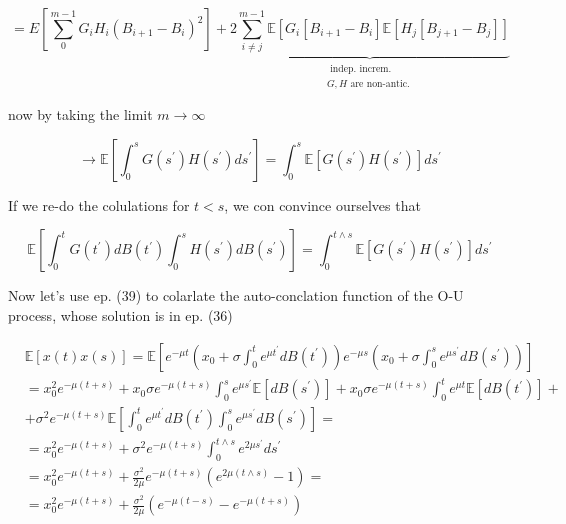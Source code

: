 \documentclass[10pt]{article}
\begin{document}
$$
=E\left[\sum_{0}^{m-1} G_{i} H_{i}\left(B_{i+1}-B_{i}\right)^{2}\right]+\underbrace{2 \sum_{i \neq j}^{m-1} \mathbb{E}\left[G_{i}\left[B_{i+1}-B_{i}\right] \mathbb{E}\left[H_{j}\left[B_{j+1}-B_{j}\right]\right]\right.}_{\substack{\text { indep. increm. } \\ G, H \text { are non-antic. }}}
$$

now by taking the limit $m \rightarrow \infty$

$$
\longrightarrow \mathbb{E}\left[\int_{0}^{s} G\left(s^{\prime}\right) H\left(s^{\prime}\right) d s^{\prime}\right]=\int_{0}^{s} \mathbb{E}\left[G\left(s^{\prime}\right) H\left(s^{\prime}\right)\right] d s^{\prime}
$$

If we re-do the colulations for $t<s$, we con convince ourselves that


\begin{equation*}
\mathbb{E}\left[\int_{0}^{t} G\left(t^{\prime}\right) d B\left(t^{\prime}\right) \int_{0}^{s} H\left(s^{\prime}\right) d B\left(s^{\prime}\right)\right]=\int_{0}^{t \wedge s} \mathbb{E}\left[G\left(s^{\prime}\right) H\left(s^{\prime}\right)\right] d s^{\prime} \tag{39}
\end{equation*}


Now let's use ep. (39) to colarlate the auto-conclation function of the O-U process, whose solution is in ep. (36)

$$
\begin{aligned}
& \mathbb{E}[x(t) x(s)]=\mathbb{E}\left[e^{-\mu t}\left(x_{0}+\sigma \int_{0}^{t} e^{\mu t^{\prime}} d B\left(t^{\prime}\right)\right) e^{-\mu s}\left(x_{0}+\sigma \int_{0}^{s} e^{\mu s^{\prime}} d B\left(s^{\prime}\right)\right)\right] \\
& =x_{0}^{2} e^{-\mu(t+s)}+x_{0} \sigma e^{-\mu(t+s)} \int_{0}^{s} e^{\mu s^{\prime}} \mathbb{E}\left[d B\left(s^{\prime}\right)\right]+x_{0} \sigma e^{-\mu(t+s)} \int_{0}^{t} e^{\mu t} \mathbb{E}\left[d B\left(t^{\prime}\right)\right]+ \\
& +\sigma^{2} e^{-\mu(t+s)} \mathbb{E}\left[\int_{0}^{t} e^{\mu t^{\prime}} d B\left(t^{\prime}\right) \int_{0}^{s} e^{\mu s^{\prime}} d B\left(s^{\prime}\right)\right]= \\
& =x_{0}^{2} e^{-\mu(t+s)}+\sigma^{2} e^{-\mu(t+s)} \int_{0}^{t \wedge s} e^{2 \mu s^{\prime}} d s^{\prime} \\
& =x_{0}^{2} e^{-\mu(t+s)}+\frac{\sigma^{2}}{2 \mu} e^{-\mu(t+s)}\left(e^{2 \mu(t \wedge s)}-1\right)= \\
& =x_{0}^{2} e^{-\mu(t+s)}+\frac{\sigma^{2}}{2 \mu}\left(e^{-\mu(t-s)}-e^{-\mu(t+s)}\right)
\end{aligned}
$$
\end{document}
